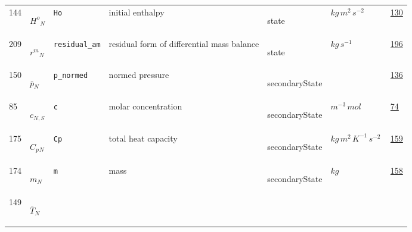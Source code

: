 \begin{longtable}{|p{1cm}|p{2.5cm}|p{4.5cm}|p{8cm}|p{3.0cm}|p{3cm}|p{1cm}|}
                 \\
            144
             & \hypertarget{"v:144"}{ $ {{H^o}}{_{N}} $}
             & \verb|Ho|
             & initial enthalpy
             & \begin{lay}state \end{lay}
             & $ kg \,m^{2} \,s^{-2} \, $
             &                 \hyperlink{"e:130"}{ 130 }
                 \\
            209
             & \hypertarget{"v:209"}{ $ {{r^m}}{_{N}} $}
             & \verb|residual_am|
             & residual form of differential mass balance
             & \begin{lay}state \end{lay}
             & $ kg \,s^{-1} \, $
             &                 \hyperlink{"e:196"}{ 196 }
                 \\
            150
             & \hypertarget{"v:150"}{ $ {{\bar{p}}}{_{N}} $}
             & \verb|p_normed|
             & normed pressure
             & \begin{lay}secondaryState \end{lay}
             & $  $
             &                 \hyperlink{"e:136"}{ 136 }
                 \\
            85
             & \hypertarget{"v:85"}{ $ {c}{_{N, S}} $}
             & \verb|c|
             & molar concentration
             & \begin{lay}secondaryState \end{lay}
             & $ m^{-3} \,mol \, $
             &                 \hyperlink{"e:74"}{ 74 }
                 \\
            175
             & \hypertarget{"v:175"}{ $ {{C_p}}{_{N}} $}
             & \verb|Cp|
             & total heat capacity
             & \begin{lay}secondaryState \end{lay}
             & $ kg \,m^{2} \,K^{-1} \,s^{-2} \, $
             &                 \hyperlink{"e:159"}{ 159 }
                 \\
            174
             & \hypertarget{"v:174"}{ $ {m}{_{N}} $}
             & \verb|m|
             & mass
             & \begin{lay}secondaryState \end{lay}
             & $ kg \, $
             &                 \hyperlink{"e:158"}{ 158 }
                 \\
            149
             & \hypertarget{"v:149"}{ $ {{\bar{T}}}{_{N}} $}

\end{longtable}

